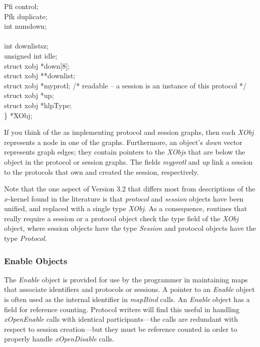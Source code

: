 \begin{tabbing}
\>\>  {\sem Pfi}  	\>control;\\
\>\>  {\sem Pfk}  	\>duplicate;\\
\>\>  {\sem int}  	\>numdown; \\
\>\>\\
\>\>  {\sem int} 	\>downlistsz;\\
\>\>  {\sem unsigned int} \>idle;\\
\>\>  {\sem struct xobj} \>*down[8];\\
\>\>  {\sem struct xobj} \>**downlist;\\
\>\>  {\sem struct xobj} \>*myprotl;\> {\smallfont /* readable -- a session is an instance of this protocol */}\\
\>\>  {\sem struct xobj} \>*up; \\
\>\>  {\sem struct xobj} \>*hlpType;\\
\>\} *{\bold XObj};
\end{tabbing}

If you think of the \xk{} as implementing protocol and session graphs,
then each {\em XObj} represents a node in one of the graphs.
Furthermore, an object's {\em down} vector represents graph edges;
they contain pointers to the {\em XObjs} that are below the object in
the protocol or session graphs. The fields {\em myprotl} and {\em up}
link a session to the protocols that own and created the session,
respectively.

Note that the one aspect of Version 3.2 that differs most from
descriptions of the $x$-kernel found in the literature is that {\it
protocol} and {\it session} objects have been unified, and replaced
with a single type {\em XObj}.  As a consequence, routines that really
require a session or a protocol object check the type field of the
{\em XObj} object, where session objects have the type {\em Session}
and protocol objects have the type {\em Protocol}.

\subsubsection{Enable Objects}
\label{enable_objects}

The {\em Enable} object is provided for use by the programmer in
maintaining maps that associate identifiers and protocols or sessions.
A pointer to an {\em Enable} object is often used as the internal
identifier in {\em mapBind} calls.  An {\em Enable} object has a field
for reference counting. Protocol writers will find this useful in
handling {\em xOpenEnable} calls with identical participants---the
calls are redundant with respect to session creation---but they must
be reference counted in order to properly handle {\em xOpenDisable}
calls.

